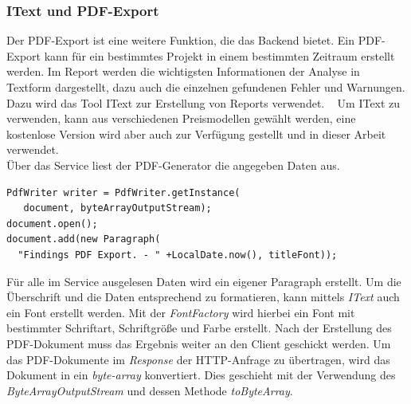 \subsubsection{IText und PDF-Export}
Der PDF-Export ist eine weitere Funktion, die das Backend bietet. Ein PDF-Export kann für ein bestimmtes Projekt in einem bestimmten Zeitraum erstellt werden. Im Report werden die wichtigsten Informationen der Analyse in Textform dargestellt, dazu auch die einzelnen gefundenen Fehler und Warnungen. \\
Dazu wird das Tool IText zur Erstellung von Reports verwendet.  ~\parencite{lowagie2011itext} Um IText zu verwenden, kann aus verschiedenen Preismodellen gewählt werden, eine kostenlose Version wird aber auch zur Verfügung gestellt und in dieser Arbeit verwendet.  \\
Über das Service liest der PDF-Generator die angegeben Daten aus.

\lstset{
  caption={Initialisierung des Writers um im Dokument einen Paragraph zu erstellen.}, 
  basicstyle=\small\ttfamily, 
  label=lst:main, 
  language=Java,
  frame=single,
  breaklines=true, %
  postbreak=\mbox{\textcolor{red}{$\hookrightarrow$}\space},
}

\begin{samepage}%
	\begin{lstlisting}[float=tbhp]
PdfWriter writer = PdfWriter.getInstance(
   document, byteArrayOutputStream);
document.open();
document.add(new Paragraph(
  "Findings PDF Export. - " +LocalDate.now(), titleFont));

	\end{lstlisting}
\end{samepage}

Für alle im Service ausgelesen Daten wird ein eigener Paragraph erstellt. Um die Überschrift und die Daten entsprechend zu formatieren, kann mittels \textit{IText} auch ein Font erstellt werden. Mit der \textit{FontFactory} wird hierbei ein Font mit bestimmter Schriftart, Schriftgröße und Farbe erstellt.
Nach der Erstellung des PDF-Dokument muss das Ergebnis weiter an den Client geschickt werden. Um das PDF-Dokumente im \textit{Response} der HTTP-Anfrage zu übertragen, wird das Dokument in ein \textit{byte-array} konvertiert. Dies geschieht mit der Verwendung des \textit{ByteArrayOutputStream} und dessen Methode \textit{toByteArray}. 

